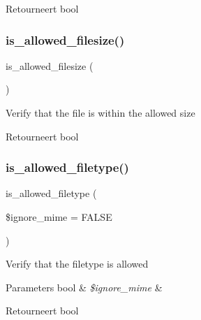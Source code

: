 \begin{DoxyReturn}{Retourneert}
bool 
\end{DoxyReturn}
\mbox{\label{class_c_i___upload_aa1283241c3b2fc700c7b577beecd5f97}} 
\subsubsection{\texorpdfstring{is\_allowed\_filesize()}{is\_allowed\_filesize()}}
{\footnotesize\ttfamily is\+\_\+allowed\+\_\+filesize (\begin{DoxyParamCaption}{ }\end{DoxyParamCaption})}

Verify that the file is within the allowed size

\begin{DoxyReturn}{Retourneert}
bool 
\end{DoxyReturn}
\mbox{\label{class_c_i___upload_a248e8cef69fc954953dc988e8d82afca}} 
\subsubsection{\texorpdfstring{is\_allowed\_filetype()}{is\_allowed\_filetype()}}
{\footnotesize\ttfamily is\+\_\+allowed\+\_\+filetype (\begin{DoxyParamCaption}\item[{}]{\$ignore\+\_\+mime = {\ttfamily FALSE} }\end{DoxyParamCaption})}

Verify that the filetype is allowed


\begin{DoxyParams}[1]{Parameters}
bool & {\em \$ignore\+\_\+mime} & \\
\hline
\end{DoxyParams}
\begin{DoxyReturn}{Retourneert}
bool 
\end{DoxyReturn}
\mbox{\label{class_c_i___upload_af6f513bc693e3ba836f23fe9bebc6427}} 
